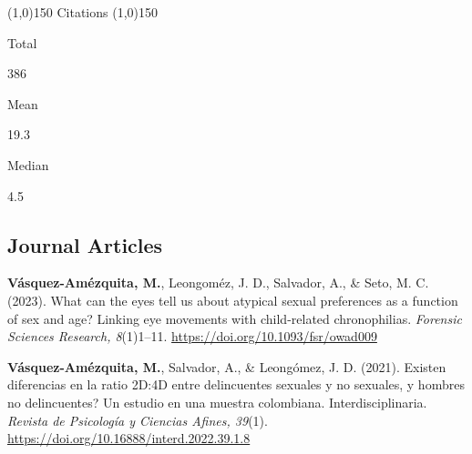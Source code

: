 \documentclass[11pt,a4paper,]{awesome-cv}
\begin{document}
\begin{tcolorbox}
  \begin{center} \noindent\line(1,0){150} Citations \noindent\line(1,0){150} \end{center}
  
  \begin{minipage}[c]{0.325\linewidth}  
    \begin{center} 
      \begin{small} Total \end{small} 
      \begin{LARGE} 386 \end{LARGE} 
    \end{center}
  \end{minipage} 
  \begin{minipage}[c]{0.325\linewidth}
    \begin{center} 
      \begin{small} Mean \end{small} 
      \begin{LARGE} 19.3 \end{LARGE}
    \end{center}
  \end{minipage} 
  \begin{minipage}[c]{0.325\linewidth}
    \begin{center}  
      \begin{small} Median \end{small} 
      \begin{LARGE} 4.5 \end{LARGE}
   \end{center}
  \end{minipage} 
\end{tcolorbox}

\hypertarget{section}{%
\subsection{\texorpdfstring{\textbf{Journal Articles}}{}}\label{section}}

\begingroup
\footnotesize
\setlength{\parindent}{-0.5in}
\setlength{\leftskip}{0.5in}

\textbf{Vásquez-Amézquita, M.}, Leongoméz, J. D., Salvador, A., \& Seto,
M. C. (2023). What can the eyes tell us about atypical sexual
preferences as a function of sex and age? Linking eye movements with
child-related chronophilias. \emph{Forensic Sciences Research,
8}(1)1--11. \url{https://doi.org/10.1093/fsr/owad009}

\textbf{Vásquez-Amézquita, M.}, Salvador, A., \& Leongómez, J. D.
(2021). Existen diferencias en la ratio 2D:4D entre delincuentes
sexuales y no sexuales, y hombres no delincuentes? Un estudio en una
muestra colombiana. Interdisciplinaria. \emph{Revista de Psicología y
Ciencias Afines, 39}(1).
\url{https://doi.org/10.16888/interd.2022.39.1.8}
\end{document}
